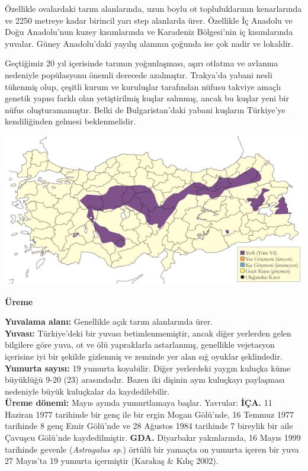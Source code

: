 \documentclass[
  letterpaper,
  DIV=11,
  numbers=noendperiod]{scrreprt}
\begin{document}
Özellikle ovalardaki tarım alanlarında, uzun boylu ot topluluklarının
kenarlarında ve 2250 metreye kadar birincil yarı step alanlarda ürer.
Özellikle İç Anadolu ve Doğu Anadolu'nun kuzey kısımlarında ve Karadeniz
Bölgesi'nin iç kısımlarında yuvalar. Güney Anadolu'daki yayılış alanının
çoğunda ise çok nadir ve lokaldir.

Geçtiğimiz 20 yıl içerisinde tarımın yoğunlaşması, aşırı otlatma ve
avlanma nedeniyle popülasyonu önemli derecede azalmıştır. Trakya'da
yabani nesli tükenmiş olup, çeşitli kurum ve kuruluşlar tarafından
nüfusu takviye amaçlı genetik yapısı farklı olan yetiştirilmiş kuşlar
salınmış, ancak bu kuşlar yeni bir nüfus oluşturamamıştır. Belki de
Bulgaristan'daki yabani kuşların Türkiye'ye kendiliğinden gelmesi
beklenmelidir.

\includegraphics{images/harita_Page_042.png}

\textbf{Üreme}

\textbf{Yuvalama alanı:} Genellikle açık tarım alanlarında ürer.\\
\textbf{Yuvası:} Türkiye'deki bir yuvası betimlenmemiştir, ancak diğer
yerlerden gelen bilgilere göre yuva, ot ve ölü yapraklarla astarlanmış,
genellikle vejetasyon içerisine iyi bir şekilde gizlenmiş ve zeminde yer
alan sığ oyuklar şeklindedir.\\
\textbf{Yumurta sayısı:} 19 yumurta koyabilir. Diğer yerlerdeki yaygın
kuluçka küme büyüklüğü 9-20 (23) arasındadır. Bazen iki dişinin aynı
kuluçkayı paylaşması nedeniyle büyük kuluçkalar da kaydedilebilir.\\
\textbf{Üreme dönemi:} Mayıs ayında yumurtlamaya başlar. Yavrular:
\textbf{İÇA.} 11 Haziran 1977 tarihinde bir genç ile bir ergin Mogan
Gölü'nde, 16 Temmuz 1977 tarihinde 8 genç Emir Gölü'nde ve 28 Ağustos
1984 tarihinde 7 bireylik bir aile Çavuşcu Gölü'nde kaydedilmiştir.
\textbf{GDA.} Diyarbakır yakınlarında, 16 Mayıs 1999 tarihinde gevenle
(\emph{Astragalus sp.}) örtülü bir yamaçta on yumurta içeren bir yuva 27
Mayıs'ta 19 yumurta içermiştir (Karakaş \& Kılıç 2002).
\end{document}
